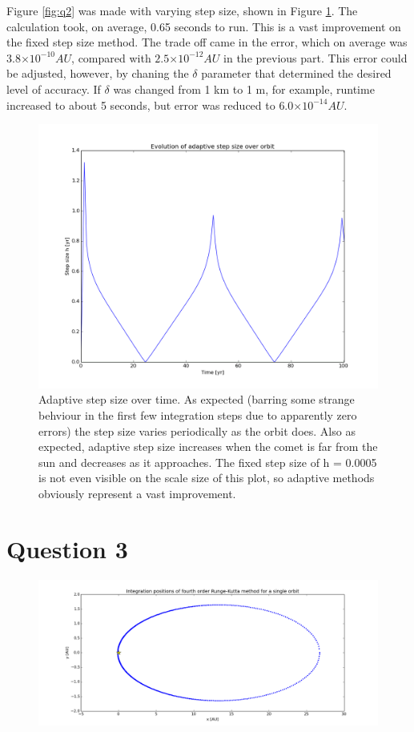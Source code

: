 \documentclass[a4paper,12pt]{article}
\providecommand{\e}[1]{\ensuremath{\times 10^{#1}}}
\begin{document}
Figure \ref{fig:q2} was made with varying step size, shown in Figure \ref{fig:q2i}. The calculation took, on average, 0.65 seconds to run. This is a vast improvement on the fixed step size method. The trade off came in the error, which on average was $3.8\e{-10} AU$, compared with $2.5\e{-12} AU$ in the previous part. This error could be adjusted, however, by chaning the $\delta$ parameter that determined the desired level of accuracy. If $\delta$ was changed from 1 km to 1 m, for example, runtime increased to about 5 seconds, but error was reduced to $6.0\e{-14} AU$.

\begin{figure}[H]
\centering
\includegraphics[width = \linewidth]{lab6q2additional.png}
\caption{Adaptive step size over time. As expected (barring some strange behviour in the first few integration steps due to apparently zero errors) the step size varies periodically as the orbit does. Also as expected, adaptive step size increases when the comet is far from the sun and decreases as it approaches. The fixed step size of h = 0.0005 is not even visible on the scale size of this plot, so adaptive methods obviously represent a vast improvement.}
\label{fig:q2i}
\end{figure}

\section{Question 3}

\begin{figure}[H]
\centering
\includegraphics[width = \linewidth]{lab6q3.png}
\caption{}
\label{fig:q3}
\end{figure}
\end{document}
